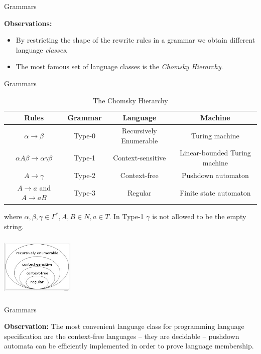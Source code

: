 \documentclass{beamer}
\begin{document}
\begin{frame}[fragile]{Grammars}

{\bf Observations:} 
\begin{itemize}
\item By restricting the shape of the rewrite rules in a grammar we obtain different language {\em classes}.
\item  The most famous set of language classes is the {\em Chomsky Hierarchy}.
\end{itemize}
\end{frame}

\begin{frame}[fragile]{Grammars}

\scriptsize

\begin{table}[htdp]
\caption{The Chomsky Hierarchy}
\begin{center}
{\tiny
\begin{tabular}{|c|c|c|c|}
Rules & Grammar & Language & Machine \\ \hline
$\alpha \rightarrow \beta$ & Type-0 & Recursively Enumerable & Turing machine \\
$\alpha A \beta \rightarrow \alpha\gamma\beta$  & Type-1 & Context-sensitive & Linear-bounded Turing machine\\
$A  \rightarrow \gamma$  & Type-2 & Context-free & Pushdown automaton\\
$A \rightarrow a$ and $A \rightarrow a B$ & Type-3 & Regular & Finite state automaton
\end{tabular}
}
\end{center}
\label{default}
\end{table}%
where $\alpha,\beta,\gamma\in \Gamma^*, A,B \in N, a\in T$.
In Type-1 $\gamma$ is not allowed to be the empty string.

\begin{center}
    \includegraphics[height=30mm,width=35mm]{images/chomsky-hierarchy}
\end{center}


\end{frame}

\begin{frame}[fragile]{Grammars}

{\bf Observation:} The most convenient language class for programming language specification are the context-free
languages -- they are decidable -- pushdown automata can be efficiently implemented in order to prove language membership.
\end{frame}
\end{document}
